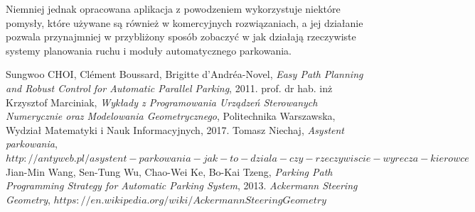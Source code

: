 \documentclass[a4paper,11pt,twoside]{report}
\theoremstyle{definition}
\begin{document}
Niemniej jednak opracowana aplikacja z powodzeniem wykorzystuje niektóre pomysły, które używane są również w komercyjnych rozwiązaniach, a jej działanie pozwala przynajmniej w przybliżony sposób zobaczyć w jak działają rzeczywiste systemy planowania ruchu i moduły automatycznego parkowania.


\begin{thebibliography}{20}%

 Sungwoo CHOI, Clément Boussard, Brigitte d’Andréa-Novel, \emph{Easy Path Planning and Robust Control for Automatic Parallel Parking}, 2011.
 prof. dr hab. inż Krzysztof Marciniak, \emph{Wykłady z Programowania Urządzeń Sterowanych Numerycznie oraz Modelowania Geometrycznego}, Politechnika Warszawska, Wydział Matematyki i Nauk Informacyjnych, 2017.
 Tomasz Niechaj, \emph{Asystent parkowania}, $http://antyweb.pl/asystent-parkowania-jak-to-dziala-czy-rzeczywiscie-wyrecza-kierowce$
  Jian-Min Wang, Sen-Tung Wu, Chao-Wei Ke, Bo-Kai Tzeng, \emph{Parking Path Programming Strategy for Automatic Parking System}, 2013.
 \emph{Ackermann Steering Geometry}, $https://en.wikipedia.org/wiki/AckermannSteeringGeometry$
\end{thebibliography}
\thispagestyle{empty}





\listoffigures
\thispagestyle{empty}


\renewcommand{\listtablename}{Spis tabel}
\listoftables
\thispagestyle{empty}
\end{document}
